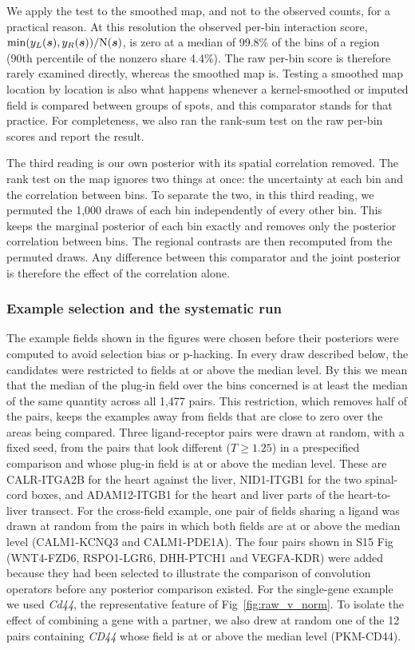 \documentclass[10pt,letterpaper]{article}
\begin{document}
We apply the test to the smoothed map, and not to the observed counts, for a practical reason. At this resolution the observed per-bin interaction score, $\min(y_L(\mbox{\boldmath $s$}), y_R(\mbox{\boldmath $s$})) / \mbox{N}(\mbox{\boldmath $s$})$, is zero at a median of 99.8\% of the bins of a region (90th percentile of the nonzero share 4.4\%). The raw per-bin score is therefore rarely examined directly, whereas the smoothed map is. Testing a smoothed map location by location is also what happens whenever a kernel-smoothed or imputed field is compared between groups of spots, and this comparator stands for that practice. For completeness, we also ran the rank-sum test on the raw per-bin scores and report the result.

The third reading is our own posterior with its spatial correlation removed. The rank test on the map ignores two things at once: the uncertainty at each bin and the correlation between bins. To separate the two, in this third reading, we permuted the 1,000 draws of each bin independently of every other bin. This keeps the marginal posterior of each bin exactly and removes only the posterior correlation between bins. The regional contrasts are then recomputed from the permuted draws. Any difference between this comparator and the joint posterior is therefore the effect of the correlation alone.

\subsubsection*{Example selection and the systematic run}

The example fields shown in the figures were chosen before their posteriors were computed to avoid selection bias or p-hacking. In every draw described below, the candidates were restricted to fields at or above the median level. By this we mean that the median of the plug-in field over the bins concerned is at least the median of the same quantity across all 1,477 pairs. This restriction, which removes half of the pairs, keeps the examples away from fields that are close to zero over the areas being compared. Three ligand-receptor pairs were drawn at random, with a fixed seed, from the pairs that look different ($T \geq 1.25$) in a prespecified comparison and whose plug-in field is at or above the median level. These are CALR-ITGA2B for the heart against the liver, NID1-ITGB1 for the two spinal-cord boxes, and ADAM12-ITGB1 for the heart and liver parts of the heart-to-liver transect. For the cross-field example, one pair of fields sharing a ligand was drawn at random from the pairs in which both fields are at or above the median level (CALM1-KCNQ3 and CALM1-PDE1A). The four pairs shown in S15 Fig (WNT4-FZD6, RSPO1-LGR6, DHH-PTCH1 and VEGFA-KDR) were added because they had been selected to illustrate the comparison of convolution operators before any posterior comparison existed. For the single-gene example we used \textit{Cd44}, the representative feature of Fig~\ref{fig:raw_v_norm}. To isolate the effect of combining a gene with a partner, we also drew at random one of the 12 pairs containing \textit{CD44} whose field is at or above the median level (PKM-CD44).
\end{document}
